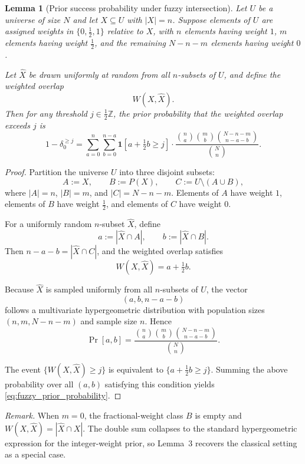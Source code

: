 \documentclass[letterpaper]{article} %
\newtheorem{lemma}[theorem]{Lemma}
\begin{document}
\begin{lemma}[Prior success probability under fuzzy intersection]
Let $U$ be a universe of size $N$ and let $X \subseteq U$ with $|X| = n$.  
Suppose elements of $U$ are assigned weights in $\{0,\tfrac12,1\}$ relative to $X$, 
with $n$ elements having weight $1$, $m$ elements having weight $\tfrac12$, 
and the remaining $N-n-m$ elements having weight $0$.

Let $\widehat{X}$ be drawn uniformly at random from all $n$-subsets of $U$, and define the weighted overlap
\[
W(X,\widehat{X}).
\]
Then for any threshold $j \in \tfrac12\mathbb{Z}$, the prior probability that the weighted overlap exceeds $j$ is
\begin{equation}
\label{eq:fuzzy_prior_probability}
1 - \delta_0^{\ge j}
=
\sum_{a=0}^{n}
\sum_{b=0}^{n-a}
\mathbf{1}\!\left[a + \tfrac12 b \ge j \right]
\cdot
\frac{
\binom{n}{a}
\binom{m}{b}
\binom{N-n-m}{\,n-a-b\,}
}{
\binom{N}{n}
}.
\end{equation}
\end{lemma}

\begin{proof}
Partition the universe $U$ into three disjoint subsets:
\[
A := X, 
\qquad 
B := P(X), 
\qquad 
C := U \setminus (A \cup B),
\]
where $|A|=n$, $|B|=m$, and $|C|=N-n-m$.  
Elements of $A$ have weight $1$, elements of $B$ have weight $\tfrac12$, and elements of $C$ have weight $0$.

For a uniformly random $n$-subset $\widehat{X}$, define
\[
a := |\widehat{X}\cap A|,
\qquad
b := |\widehat{X}\cap B|.
\]
Then $n-a-b = |\widehat{X}\cap C|$, and the weighted overlap satisfies
\[
W(X,\widehat{X}) = a + \tfrac12 b.
\]

Because $\widehat{X}$ is sampled uniformly from all $n$-subsets of $U$, the vector
\[
(a,b,n-a-b)
\]
follows a multivariate hypergeometric distribution with population sizes $(n,m,N-n-m)$ and sample size $n$. Hence
\[
\Pr[a,b]
=
\frac{
\binom{n}{a}
\binom{m}{b}
\binom{N-n-m}{\,n-a-b\,}
}{
\binom{N}{n}
}.
\]

The event $\{W(X,\widehat{X}) \ge j\}$ is equivalent to $\{a + \tfrac12 b \ge j\}$. Summing the above probability over all $(a,b)$ satisfying this condition yields \eqref{eq:fuzzy_prior_probability}.\end{proof}


\noindent
\emph{Remark.} When $m=0$, the fractional-weight class $B$ is empty and $W(X,\widehat{X})=|\widehat{X}\cap X|$. The double sum collapses to the standard hypergeometric expression for the integer-weight prior, so Lemma~3 recovers the classical setting as a special case.
\end{document}
